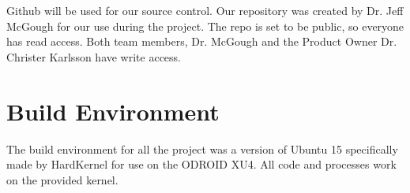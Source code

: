 Github will be used for our source control. Our repository was created by Dr. Jeff McGough for our use during the project. The repo is set to be public, so everyone has read access. Both team members, Dr. McGough and the Product Owner Dr. Christer Karlsson have write access.

\section{Build  Environment}

The build environment for all the project was a version of Ubuntu 15 specifically made by HardKernel for use on the ODROID XU4. All code and processes work on the provided kernel.
